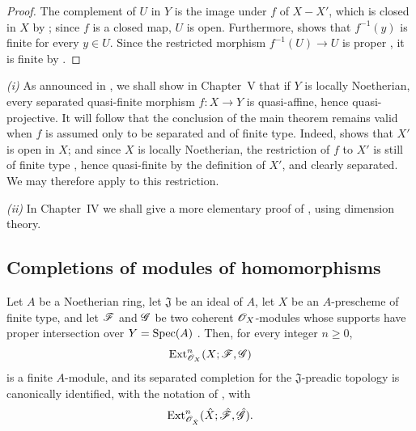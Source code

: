 \begin{proof}
The complement of $U$ in $Y$ is the image under $f$ of $X-X'$, which
is closed in $X$ by ; since $f$ is a closed map,
$U$ is open.  Furthermore,  shows that
$f^{-1}(y)$ is finite for every $y\in U$.  Since the restricted
morphism $f^{-1}(U)\to U$ is proper , it is finite
by .
\end{proof}

\begin{remark}[4.4.12]
\label{III.4.4.12}
\emph{(i)}
As announced in , we shall show in Chapter~V that
if $Y$ is locally Noetherian, every separated quasi-finite morphism
$f:X\to Y$ is quasi-affine, hence quasi-projective.  It will follow
that the conclusion of the main theorem  remains
valid when $f$ is assumed only to be separated and of finite type.
Indeed,  shows that $X'$ is open in $X$; and since
$X$ is locally Noetherian, the restriction of $f$ to $X'$ is still
of finite type , hence quasi-finite by the definition
of $X'$, and clearly separated.  We may therefore apply
 to this restriction.

\emph{(ii)}
In Chapter~IV we shall give a more elementary proof of
, using dimension theory.
\end{remark}


\subsection{Completions of modules of homomorphisms}
\label{subsection:III.4.5}

\begin{proposition}[4.5.1]
\label{III.4.5.1}
Let $A$ be a Noetherian ring, let $\mathfrak J$ be an ideal of $A$,
let $X$ be an $A$-prescheme of finite type, and let $\mathscr{F}$ and
$\mathscr{G}$ be two coherent $\mathscr{O}_X$-modules whose supports have
proper intersection over $Y=\operatorname{Spec}(A)$ .  Then,
for every integer $n\geq0$,
\[
  \operatorname{Ext}^n_{\mathscr{O}_X}(X;\mathscr{F},\mathscr{G})
\]
is a finite $A$-module, and its separated completion for the
$\mathfrak J$-preadic topology is canonically identified, with the
notation of , with
\[
  \operatorname{Ext}^n_{\mathscr{O}_{\hat{X}}}
    (\hat{X};\hat{\mathscr{F}},\hat{\mathscr{G}}).
\]
\end{proposition}

